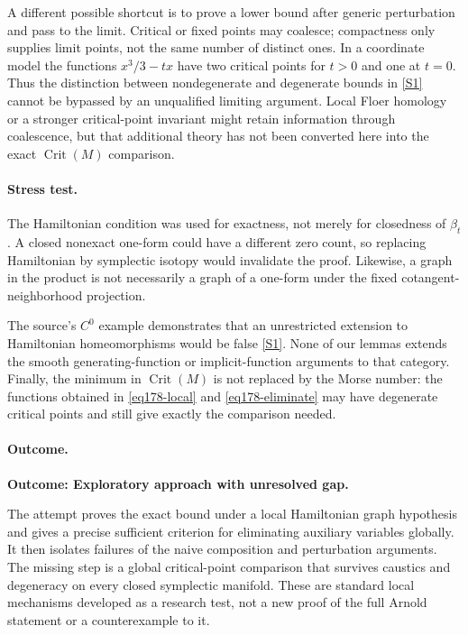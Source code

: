 \documentclass[11pt,a4paper]{article}
\newcommand{\sref}[2]{\hyperlink{source:#1:#2}{[S#2]}}
\numberwithin{equation}{section}
\begin{document}
A different possible shortcut is to prove a lower bound after generic
perturbation and pass to the limit. Critical or fixed points may coalesce;
compactness only supplies limit points, not the same number of distinct
ones. In a coordinate model the functions
$x^3/3-tx$ have two critical points for $t>0$ and one at $t=0$.
Thus the distinction between nondegenerate and degenerate bounds in
\sref{178}{1} cannot be bypassed by an unqualified limiting argument.
Local Floer homology or a stronger critical-point invariant might retain
information through coalescence, but that additional theory has not been
converted here into the exact $\operatorname{Crit}(M)$ comparison.

\paragraph{Stress test.}
The Hamiltonian condition was used for exactness, not merely for closedness
of $\beta_t$. A closed nonexact one-form could have a different zero count,
so replacing Hamiltonian by symplectic isotopy would invalidate the proof.
Likewise, a graph in the product is not necessarily a graph of a one-form
under the fixed cotangent-neighborhood projection.

The source's $C^0$ example demonstrates that an unrestricted extension to
Hamiltonian homeomorphisms would be false \sref{178}{1}. None of our lemmas
extends the smooth generating-function or implicit-function arguments to
that category. Finally, the minimum in $\operatorname{Crit}(M)$ is not
replaced by the Morse number: the functions obtained in
\eqref{eq178-local} and \eqref{eq178-eliminate} may have degenerate
critical points and still give exactly the comparison needed.

\paragraph{Outcome.}
\textbf{Outcome: Exploratory approach with unresolved gap.}

The attempt proves the exact bound under a local Hamiltonian graph
hypothesis and gives a precise sufficient criterion for eliminating
auxiliary variables globally. It then isolates failures of the naive
composition and perturbation arguments. The missing step is a global
critical-point comparison that survives caustics and degeneracy on every
closed symplectic manifold. These are standard local mechanisms developed
as a research test, not a new proof of the full Arnold statement or a
counterexample to it.
\end{document}
